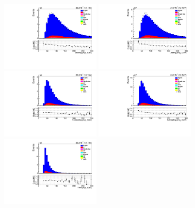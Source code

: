 \begin{figure}[!ht]
\centering
\includegraphics[width=0.45\textwidth]{figs/background-estimation/plots/unblinded/DY_control_old_prompt_ee_DYamcatnlo/leadingJetPt_SingleTop_jetSel_ee.pdf}
\includegraphics[width=0.45\textwidth]{figs/background-estimation/plots/unblinded/DY_control_old_prompt_mumu_DYamcatnlo/leadingJetPt_SingleTop_jetSel_mumu.pdf}
\\
\includegraphics[width=0.45\textwidth]{figs/background-estimation/plots/unblinded/DY_control_old_prompt_ee_DYamcatnlo/secondJetPt_SingleTop_jetSel_ee.pdf}
\includegraphics[width=0.45\textwidth]{figs/background-estimation/plots/unblinded/DY_control_old_prompt_mumu_DYamcatnlo/secondJetPt_SingleTop_jetSel_mumu.pdf}
\\
\includegraphics[width=0.45\textwidth]{figs/background-estimation/plots/unblinded/DY_control_old_prompt_ee_DYamcatnlo/thirdJetPt_SingleTop_jetSel_ee.pdf}

\end{figure}
